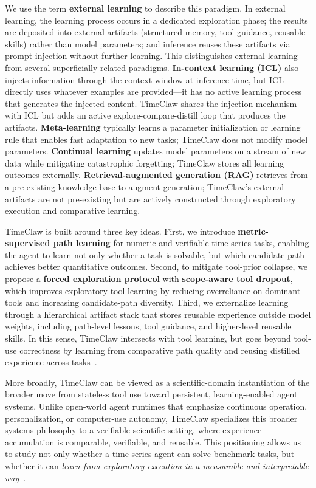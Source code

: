We use the term \textbf{external learning} to describe this paradigm. In external learning, the learning process occurs in a dedicated exploration phase; the results are deposited into external artifacts (structured memory, tool guidance, reusable skills) rather than model parameters; and inference reuses these artifacts via prompt injection without further learning. This distinguishes external learning from several superficially related paradigms. \textbf{In-context learning (ICL)} also injects information through the context window at inference time, but ICL directly uses whatever examples are provided---it has no active learning process that generates the injected content. TimeClaw shares the injection mechanism with ICL but adds an active explore-compare-distill loop that produces the artifacts. \textbf{Meta-learning} typically learns a parameter initialization or learning rule that enables fast adaptation to new tasks; TimeClaw does not modify model parameters. \textbf{Continual learning} updates model parameters on a stream of new data while mitigating catastrophic forgetting; TimeClaw stores all learning outcomes externally. \textbf{Retrieval-augmented generation (RAG)} retrieves from a pre-existing knowledge base to augment generation; TimeClaw's external artifacts are not pre-existing but are actively constructed through exploratory execution and comparative learning.

TimeClaw is built around three key ideas. First, we introduce \textbf{metric-supervised path learning} for numeric and verifiable time-series tasks, enabling the agent to learn not only whether a task is solvable, but which candidate path achieves better quantitative outcomes. Second, to mitigate tool-prior collapse, we propose a \textbf{forced exploration protocol} with \textbf{scope-aware tool dropout}, which improves exploratory tool learning by reducing overreliance on dominant tools and increasing candidate-path diversity. Third, we externalize learning through a hierarchical artifact stack that stores reusable experience outside model weights, including path-level lessons, tool guidance, and higher-level reusable skills. In this sense, TimeClaw intersects with tool learning, but goes beyond tool-use correctness by learning from comparative path quality and reusing distilled experience across tasks~\cite{toolformer,gorilla,toolllm,memskill,asda,skillsd}. %

More broadly, TimeClaw can be viewed as a scientific-domain instantiation of the broader move from stateless tool use toward persistent, learning-enabled agent systems. Unlike open-world agent runtimes that emphasize continuous operation, personalization, or computer-use autonomy, TimeClaw specializes this broader systems philosophy to a verifiable scientific setting, where experience accumulation is comparable, verifiable, and reusable. This positioning allows us to study not only whether a time-series agent can solve benchmark tasks, but whether it can \emph{learn from exploratory execution in a measurable and interpretable way}~\cite{openclawrl,cuaskill,clawkeeper}.

